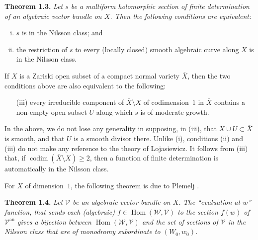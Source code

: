\documentclass{report}
\newenvironment{itenv}[1]
  {\phantomsection\par\medskip\noindent\textbf{#1.}\itshape}
  {\medskip}
\newcommand{\scr}[1]{{\mathscr{#1}}}
\renewcommand{\cal}[1]{{\mathcal{#1}}}
\newcommand{\an}{\mathrm{an}}
\renewcommand{\geq}{\geqslant}
\DeclareMathOperator{\Hom}{Hom}
\DeclareMathOperator{\codim}{codim}
\newcommand{\oldpage}[1]{\marginpar{\footnotesize$\Big\vert$ \textit{p.~#1}}}
\begin{document}
\begin{itenv}{Theorem 1.3}
\label{III.1.3}
  Let $s$ be a multiform holomorphic section of finite determination of an algebraic vector bundle on $X$.
  Then the following conditions are equivalent:
  \begin{enumerate}[(i)]
    \item $s$ is in the Nilsson class; and
    \item the restriction of $s$ to every (locally closed) smooth algebraic curve along $X$ is in the Nilsson class.
  \end{enumerate}
\oldpage{123}
  If $X$ is a Zariski open subset of a compact normal variety $\overline{X}$, then the two conditions above are also equivalent to the following:
  \begin{enumerate}
    \item[{\rm(iii)}] every irreducible component of $\overline{X}\setminus X$ of codimension~$1$ in $\overline{X}$ contains a non-empty open subset $U$ along which $s$ is of moderate growth.
  \end{enumerate}
\end{itenv}

In the above, we do not lose any generality in supposing, in (iii), that $X\cup U\subset\overline{X}$ is smooth, and that $U$ is a smooth divisor there.
Unlike (i), conditions (ii) and (iii) do not make any reference to the theory of Lojasiewicz.
It follows from (iii) that, if $\codim(\overline{X}\setminus X)\geq2$, then a function of finite determination is automatically in the Nilsson class.

For $X$ of dimension~$1$, the following theorem is due to Plemelj \cite{23}.

\begin{itenv}{Theorem 1.4}
\label{III.1.4}
  Let $\cal{V}$ be an algebraic vector bundle on $X$.
  The ``evaluation at $w$'' function, that sends each (algebraic) $f\in\Hom(\scr{W},\cal{V})$ to the section $f(w)$ of $\cal{V}^\an$ gives a bijection between $\Hom(\scr{W},\cal{V})$ and the set of sections of $\cal{V}$ in the Nilsson class that are of monodromy subordinate to $(W_0,w_0)$.
\end{itenv}
\end{document}
